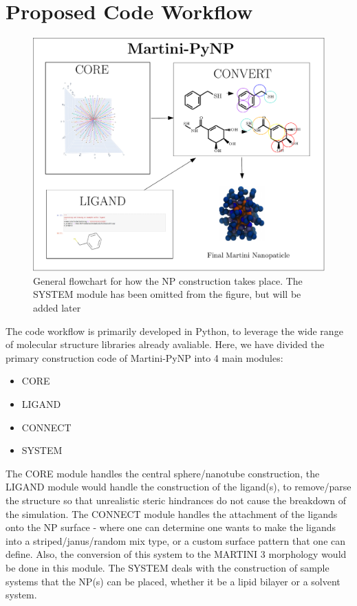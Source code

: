 \documentclass[12pt]{article}
\begin{document}
\section{Proposed Code Workflow}
\begin{figure} %
  \centering
  \includegraphics[scale=0.4]{schema.pdf}
  \caption{General flowchart for how the NP construction takes place. The SYSTEM module has been omitted from the figure, but will be added later}
\end{figure}
The code workflow is primarily developed in Python, to leverage the wide range of molecular structure libraries already avaliable. Here, we have divided the
primary construction code of Martini-PyNP into 4 main modules: 
\begin{itemize}
\item CORE
\item LIGAND
\item CONNECT
\item SYSTEM 
\end{itemize}
The CORE module handles the central sphere/nanotube construction, the LIGAND module would handle the construction of the ligand(s), to remove/parse
the structure so that unrealistic steric hindrances do not cause the breakdown of the simulation. The CONNECT module handles the attachment of the ligands
onto the NP surface - where one can determine one wants to make the ligands into a striped/janus/random mix type, or a custom surface pattern that one can define. Also,
the conversion of this system to the MARTINI 3 morphology would be done in this module. The SYSTEM deals with the construction of sample systems that the NP(s) can be placed, whether it be a lipid bilayer or a solvent system. 
\end{document}
